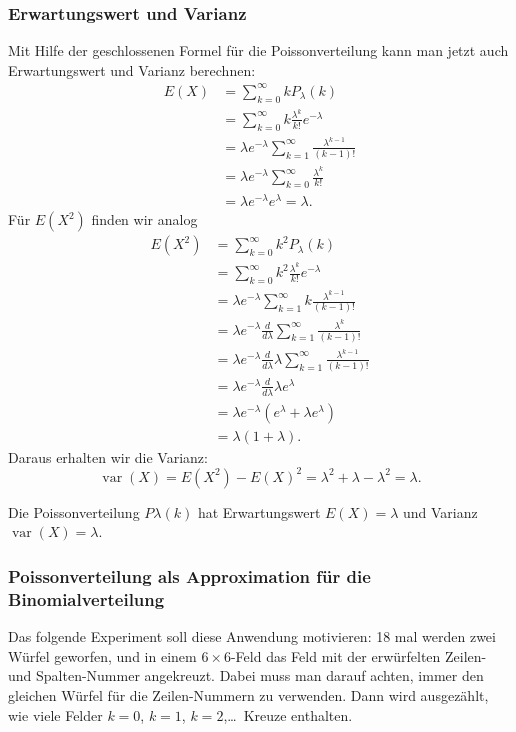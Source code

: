 \subsubsection{Erwartungswert und Varianz}
Mit Hilfe der geschlossenen Formel für die Poissonverteilung kann man
jetzt auch Erwartungswert und Varianz berechnen:
\begin{align*}
E(X)
&=\sum_{k=0}^\infty kP_\lambda(k)\\
&=\sum_{k=0}^\infty k\frac{\lambda^k}{k!}e^{-\lambda}\\
&=\lambda e^{-\lambda}\sum_{k=1}^\infty\frac{\lambda^{k-1}}{(k-1)!}\\
&=\lambda e^{-\lambda}\sum_{k=0}^\infty\frac{\lambda^k}{k!}\\
&=\lambda e^{-\lambda}e^\lambda=\lambda.
\end{align*}
Für $E(X^2)$ finden wir analog
\begin{align*}
E(X^2)
&=\sum_{k=0}^\infty k^2P_\lambda(k)\\
&=\sum_{k=0}^\infty k^2\frac{\lambda^k}{k!}e^{-\lambda}\\
&=\lambda e^{-\lambda}\sum_{k=1}^\infty k\frac{\lambda^{k-1}}{(k-1)!}\\
&=\lambda e^{-\lambda}\frac{d}{d\lambda}\sum_{k=1}^\infty \frac{\lambda^k}{(k-1)!}\\
&=\lambda e^{-\lambda}\frac{d}{d\lambda}\lambda\sum_{k=1}^\infty \frac{\lambda^{k-1}}{(k-1)!}\\
&=\lambda e^{-\lambda}\frac{d}{d\lambda}\lambda e^{\lambda}\\
&=\lambda e^{-\lambda}(e^\lambda+\lambda e^\lambda)\\
&=\lambda(1+\lambda).
\end{align*}
Daraus erhalten wir die Varianz:
\[
\operatorname{var}(X)=E(X^2)-E(X)^2=\lambda^2+\lambda -\lambda^2 =\lambda.
\]
\begin{satz}
Die Poissonverteilung $P\lambda(k)$ hat Erwartungswert
$E(X)=\lambda$ und Varianz $\operatorname{var}(X)=\lambda$.
\end{satz}

\subsubsection{Poissonverteilung als Approximation für die Binomialverteilung}
Das folgende Experiment soll diese Anwendung motivieren: 18 mal werden zwei 
Würfel geworfen, und in einem $6\times 6$-Feld das Feld mit der
erwürfelten Zeilen- und Spalten-Nummer angekreuzt.
Dabei muss man darauf
achten, immer den gleichen Würfel für die Zeilen-Nummern zu verwenden.
Dann wird ausgezählt, wie viele Felder $k=0$, $k=1$, $k=2$,\dots\ Kreuze
enthalten.

